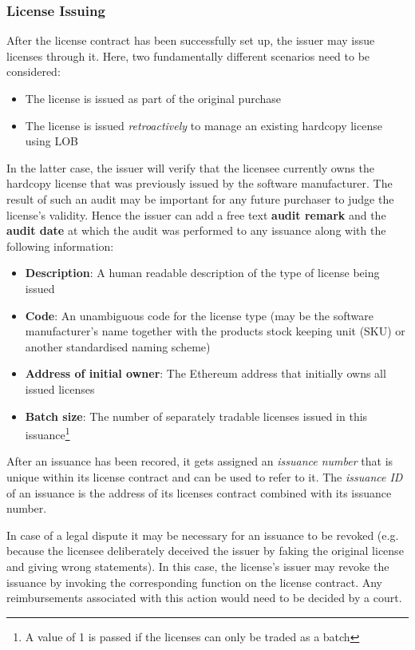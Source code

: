 \documentclass[a4paper]{article}
\begin{document}
\subsubsection{License Issuing}
\label{ch:licenseContractIssuing}

After the license contract has been successfully set up, the issuer may issue licenses through it. Here, two fundamentally different scenarios need to be considered:
\begin{itemize}
  \item The license is issued as part of the original purchase
  \item The license is issued \emph{retroactively} to manage an existing hardcopy license using LOB
\end{itemize}

In the latter case, the issuer will verify that the licensee currently owns the hardcopy license that was previously issued by the software manufacturer. The result of such an audit may be important for any future purchaser to judge the license's validity. Hence the issuer can add a free text \textbf{audit remark} and the \textbf{audit date} at which the audit was performed to any issuance along with the following information:

\begin{itemize}
  \item \textbf{Description}: A human readable description of the type of license being issued
  \item \textbf{Code}: An unambiguous code for the license type (may be the software manufacturer's name together with the products stock keeping unit (SKU) or another standardised naming scheme)
  \item \textbf{Address of initial owner}: The Ethereum address that initially owns all issued licenses
  \item \textbf{Batch size}: The number of separately tradable licenses issued in this issuance\footnote{A value of 1 is passed if the licenses can only be traded as a batch}
\end{itemize}

After an issuance has been recored, it gets assigned an \emph{issuance number} that is unique within its license contract and can be used to refer to it. The \emph{issuance ID} of an issuance is the address of its licenses contract combined with its issuance number.

In case of a legal dispute it may be necessary for an issuance to be revoked (e.g. because the licensee deliberately deceived the issuer by faking the original license and giving wrong statements). In this case, the license's issuer may revoke the issuance by invoking the corresponding function on the license contract. Any reimbursements associated with this action would need to be decided by a court.
\end{document}

